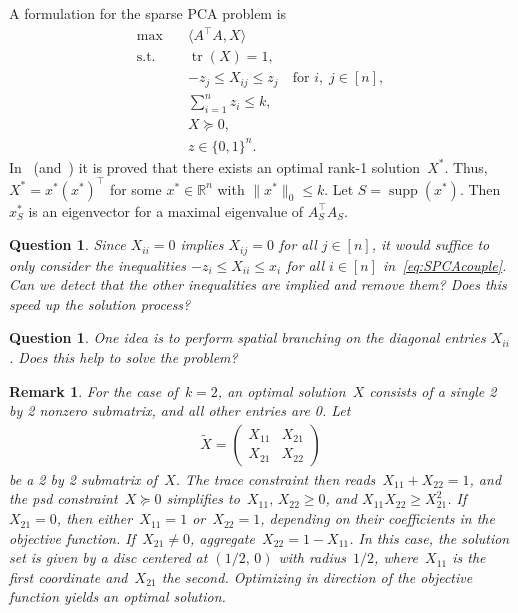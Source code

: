 \documentclass[10pt, a4paper]{article}
\DeclareMathOperator{\supp}{supp}
\DeclareMathOperator{\tr}{tr}
\newcommand{\Norm}[2]{\lVert{#1}\rVert_{#2}}
\newcommand{\skal}[2]{\langle{#1},{#2}\rangle}
\newcommand{\T}{^{\top}}
\newcommand{\R}{\mathds{R}}
\newtheorem{question}[theorem]{Question}
\newtheorem{remark}[theorem]{Remark}
\begin{document}
A formulation for the sparse PCA problem is
\begin{subequations}\label{eq:SPCA}
  \begin{align}
    \max \quad & \skal{A\T A}{X} \\
    \text{s.t.} \quad & \tr(X) = 1, \\
    & -z_j \leq X_{ij} \leq z_j \quad \text{for } i,\; j \in [n],\label{eq:SPCAcouple} \\
    & \sum_{i=1}^n z_i \leq k,\\
    & X \succeq 0, \\
    & z \in \{0,1\}^n.
  \end{align}
\end{subequations}
In~\cite{GalP16} (and~\cite{LiX20}) it is proved that there exists an
optimal rank-1 solution~$X^*$. Thus, $X^* = x^* (x^*)\T$ for some
$x^* \in \R^n$ with $\Norm{x^*}{0} \leq k$. Let $S = \supp(x^*)$. Then
$x^*_S$ is an eigenvector for a maximal eigenvalue of
$A_S\T A_S^{\phantom{T}}$.

\begin{question}
  Since $X_{ii} = 0$ implies $X_{ij} = 0$ for all $j \in [n]$, it would
  suffice to only consider the inequalities $-z_i \leq X_{ii} \leq x_i$ for
  all $i \in [n]$ in~\eqref{eq:SPCAcouple}. Can we detect that the other
  inequalities are implied and remove them? Does this speed up the solution
  process?
\end{question}

\begin{question}
  One idea is to perform spatial branching on the diagonal entries
  $X_{ii}$. Does this help to solve the problem?
\end{question}

\begin{remark}
  For the case of~$k=2$, an optimal solution~$X$ consists of a single 2 by
  2 nonzero submatrix, and all other entries are 0. Let
  \begin{align*}
    \tilde{X} =  \begin{pmatrix}
      X_{11} & X_{21} \\
      X_{21} & X_{22}
    \end{pmatrix}
  \end{align*}
  be a 2 by 2 submatrix of~$X$. The trace constraint then
  reads~$X_{11} + X_{22} = 1$, and the psd constraint~$X \succeq 0$
  simplifies to~$X_{11},\, X_{22} \geq 0$, and $X_{11}X_{22}\geq
  X_{21}^2$. If~$X_{21} = 0$, then either~$X_{11} = 1$ or~$X_{22} = 1$,
  depending on their coefficients in the objective function.
  If~$X_{21} \neq 0$, aggregate~$X_{22} = 1 - X_{11}$. In this case, the
  solution set is given by a disc centered at $(1/2,\,0)$ with
  radius~$1/2$, where~$X_{11}$ is the first coordinate and~$X_{21}$ the
  second. Optimizing in direction of the objective function yields an
  optimal solution.
\end{remark}
\end{document}
